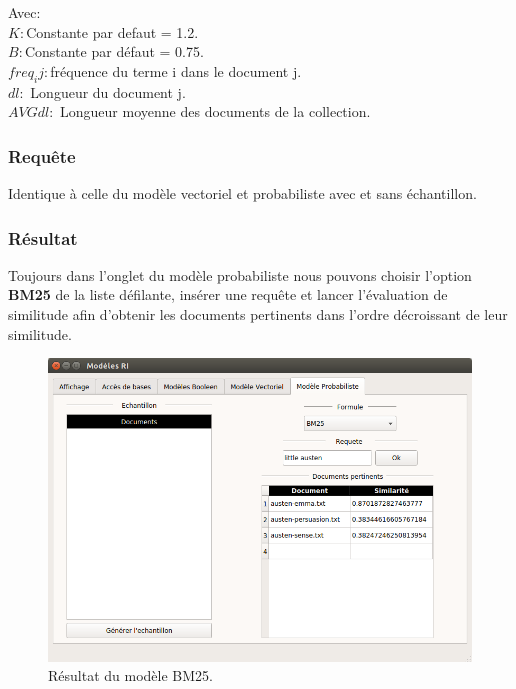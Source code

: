 \documentclass[12pt,a4paper,oneside]{article}
\begin{document}
Avec:\\
$K: $Constante par defaut = 1.2.\\
$B: $Constante par défaut = 0.75.\\
$freq_ij :$fréquence du terme i dans le document j.\\
$dl: $ Longueur du document j.\\
$AVG dl: $ Longueur moyenne des documents de la collection.

\subsubsection*{Requête}
Identique à celle du modèle vectoriel et probabiliste avec et sans échantillon.



\subsubsection*{Résultat}
Toujours dans l'onglet du modèle probabiliste nous pouvons choisir l'option \textbf{BM25} de la liste défilante, insérer une requête et lancer l'évaluation de similitude afin d'obtenir les documents pertinents dans l'ordre décroissant de leur similitude.

	\begin{figure}[H]
		\centering
		\includegraphics[scale=0.4]{images/modeleP4.png}
		\caption{Résultat du modèle BM25.}
	\end{figure}
\newpage
\end{document}
